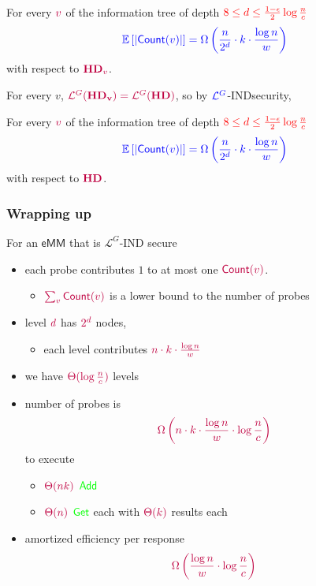 \documentclass[]{beamer}
\newcommand{\emm}{{\mathsf{eMM}}}
\newcommand{\GetMM}{\mathsf{Get}}
\newcommand{\AddMM}{\mathsf{Add}}
\newcommand{\calL}{\mathcal{L}}
\newcommand{\lQ}{\calL^G}
\begin{document}
\begin{frame}
\frametitle{}
\begin{theorem}
For every $\color{purple}v$ of the {\color{red} information tree} of depth
$\color{red} 8\leq d\leq \frac{1-\epsilon}{2}\log{\frac{n}{c}}$
$$\color{blue} \mathbb{E}\left[\left| \mathsf{Count}(v)\right|\right]=\Omega\left(
        \frac{n}{2^d}\cdot k\cdot\frac{\log n}{w}\right)$$
with respect to $\color{purple}\mathbf{HD}_v$.
\end{theorem}

\pause

For every $v$, $\color{purple}\lQ(\mathbf{HD_v})=\lQ(\mathbf{HD})$,
so by {\color{blue}$\color{blue}\lQ$-INDsecurity},
\pause

\begin{theorem}
For every $\color{purple}v$ of the {\color{red} information tree} of depth
$\color{red} 8\leq d\leq \frac{1-\epsilon}{2}\log{\frac{n}{c}}$
$$\color{blue} \mathbb{E}\left[\left| \mathsf{Count}(v)\right|\right]=\Omega\left(
        \frac{n}{2^d}\cdot k\cdot\frac{\log n}{w}\right)$$
with respect to $\color{purple}\mathbf{HD}$.
\end{theorem}
\end{frame}

\begin{frame}
\frametitle{Wrapping up}

For an $\emm$ that is $\lQ$-IND secure
\begin{itemize}[<+->]
\item each probe contributes $1$ to at most one $\color{purple}\mathsf{Count}(v)$.
    \begin{itemize}
    \item 
$\color{purple}\sum_v\mathsf{Count}(v)$ is a lower bound to the number of probes
    \end{itemize}
\item level $\color{purple} d$ has $\color{purple} 2^d$ nodes,
    \begin{itemize}
    \item each level contributes $\color{purple}n\cdot k\cdot\frac{\log n}{w}$
    \end{itemize}
\item we have $\color{purple}\Theta(\log{\frac{n}{c}})$ levels
\item number of probes is
$$\color{purple}\Omega\left(n\cdot k\cdot\frac{\log n}{w}\cdot\log{\frac{n}{c}}\right)$$
to execute
\begin{itemize}
\item $\color{purple}\Theta(nk)$ $\color{green}\AddMM$ 
\item $\color{purple}\Theta(n)$ $\color{green}\GetMM$ each with $\color{purple}\Theta(k)$ results each
\end{itemize}
\item amortized efficiency per response
$$\color{purple}\Omega\left(\frac{\log n}{w}\cdot\log{\frac{n}{c}}\right)$$
\end{itemize}
\end{frame}
\end{document}
